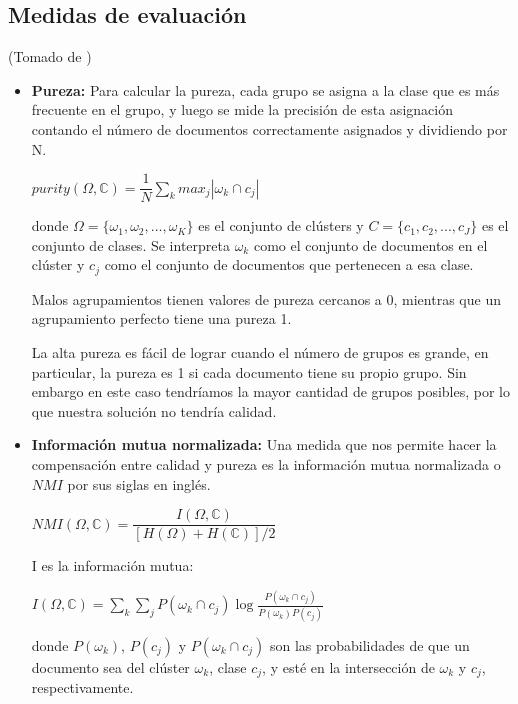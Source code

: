 \documentclass{llncs}
\begin{document}
\subsection{Medidas de evaluaci\'on} 
	\begin{flushright}
		\scriptsize*(Tomado de \cite{B1})
	\end{flushright}
	\normalsize
	\begin{itemize}
	\item \textbf{Pureza:} Para calcular la pureza, cada grupo se asigna a la clase que es más frecuente en el grupo, y luego se mide la precisión de esta asignación contando el número de documentos correctamente asignados y dividiendo por N.
	
	\begin{center}
		$purity(\Omega, \mathbb{C}) = \dfrac{1}{N} \sum_{k}max_{j} |\omega_{k} \cap c_{j}| $
	\end{center}
	
	donde $ \Omega = \{\omega_{1}, \omega_{2}, ... , \omega_{K}\} $ es el conjunto de cl\'usters y $ C = \{c_{1}, c_{2}, ... , c_{J}\} $ es el conjunto de clases. Se interpreta $ \omega_{k} $ como el conjunto de documentos en el cl\'uster y $ c_{j} $ como el conjunto de documentos que pertenecen a esa clase.
	
	Malos agrupamientos tienen valores de pureza cercanos a 0, mientras que un agrupamiento perfecto tiene una pureza 1.
	
	La alta pureza es fácil de lograr cuando el número de grupos es grande, en particular, la pureza es 1 si cada documento tiene su propio grupo. Sin embargo en este caso tendr\'iamos la mayor cantidad de grupos posibles, por lo que nuestra soluci\'on no tendr\'ia calidad.
	
	\vspace{1em}
	\item \textbf{Información mutua normalizada:} Una medida que nos permite hacer la compensaci\'on entre calidad y pureza es la información mutua normalizada o $ NMI $ por sus siglas en ingl\'es.
	
	\begin{center}
		$ NMI(\Omega, \mathbb{C}) = \dfrac{I(\Omega, \mathbb{C})}{[H(\Omega) + H(\mathbb{C})]/2}
		$
	\end{center}
	
	I es la informaci\'on mutua:
	\begin{center}
		$ I(\Omega, \mathbb{C}) = \sum_{k}\sum_{j}P(\omega_{k} \cap c_{j})\log\frac{P(\omega_{k} \cap c_{j})}{P(\omega_{k})P(c_{j})} $
	\end{center}
	donde $ P(\omega_{k}) $, $ P(c_{j}) $ y $ P(\omega_{k} \cap c_{j}) $ son las probabilidades de que un documento sea del cl\'uster $ \omega_{k} $, clase $ c_{j} $, y est\'e en la intersección de $ \omega_{k} $ y $ c_{j} $, respectivamente.
	

\end{itemize}
\end{document}
